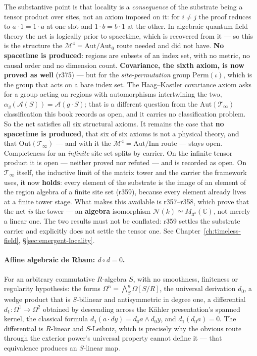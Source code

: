 The substantive point is that locality is a \emph{consequence} of the substrate
being a tensor product over sites, not an axiom imposed on it: for $i \neq j$
the proof reduces to $a\cdot 1 = 1 \cdot a$ at one slot and $1 \cdot b =
b \cdot 1$ at the other. In algebraic quantum field theory the net is logically
prior to spacetime, which is recovered from it --- so this is the structure the
$\mathcal{M}^4 = \mathrm{Aut}/\mathrm{Aut}_0$ route needed and did not have.
\textbf{No spacetime is produced}: regions are subsets of an index set, with no
metric, no causal order and no dimension count. \textbf{Covariance, the sixth
axiom, is now proved as well} (r375) --- but for the \emph{site-permutation}
group $\mathrm{Perm}(\iota)$, which is the group that acts on a bare index set.
The Haag--Kastler covariance axiom asks for a group acting on regions with
automorphisms intertwining the two, $\alpha_g(\mathcal{A}(S)) =
\mathcal{A}(g\cdot S)$; that is a different question from the
$\mathrm{Aut}(\mathcal{T}_\infty)$ classification this book records as open,
and it carries no classification problem. So the net satisfies all six
structural axioms. It remains the case that \textbf{no spacetime is produced},
that six of six axioms is not a physical theory, and that
$\mathrm{Out}(\mathcal{T}_\infty)$ --- and with it the
$\mathcal{M}^4 = \mathrm{Aut}/\mathrm{Inn}$ route --- stays open. Completeness for an \emph{infinite} site set
splits by carrier. On the infinite tensor product it is open --- neither proved
nor refuted --- and is recorded as open. On $\mathcal{T}_\infty$ itself, the
inductive limit of the matrix tower and the carrier the framework uses, it now
\textbf{holds}: every element of the substrate is the image of an element of the
region algebra of a finite site set (r359), because every element already lives
at a finite tower stage. What makes this available is r357--r358, which prove
that the net \emph{is} the tower --- an \textbf{algebra} isomorphism
$\mathcal{N}(k) \simeq M_{3^k}(\mathbb{C})$, not merely a linear one. The two
results must not be conflated: r359 settles the substrate carrier and
explicitly does not settle the tensor one.
See Chapter~\ref{ch:timeless-field}, \S\ref{sec:emergent-locality}.

\paragraph{Affine algebraic de Rham: $d \circ d = 0$.}
For an arbitrary commutative $R$-algebra $S$, with no smoothness, finiteness or
regularity hypothesis: the forms $\Omega^n = \bigwedge^n_S \Omega[S/R]$, the
universal derivation $d_0$, a wedge product that is $S$-bilinear and
antisymmetric in degree one, a differential $d_1 : \Omega^1 \to \Omega^2$
obtained by descending across the Kähler presentation's spanned kernel, the
classical formula $d_1(a \cdot dy) = d_0a \wedge d_0y$, and
$d_1(d_0 a) = 0$. The differential is $R$-linear and $S$-Leibniz, which is
precisely why the obvious route through the exterior power's universal property
cannot define it --- that equivalence produces an $S$-linear map.

